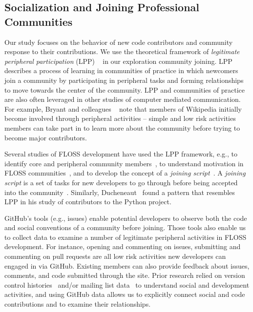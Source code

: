 \documentclass{sigchi}
\begin{document}
\subsection{Socialization and Joining Professional Communities} \label{sec:communities}
Our study focuses on the behavior of new code contributors and community
response to their contributions. We use the theoretical framework of
\textit{legitimate peripheral participation} (LPP) ~\cite{lave_situated_1991} in
our exploration community joining. LPP describes a process of learning in
communities of practice in which newcomers join a community by participating in
peripheral tasks and forming relationships to move towards the center of the
community. LPP and communities of practice are also often leveraged in other studies of
computer mediated communication. For example, Bryant
and colleagues ~\cite{bryant_becoming_2005} note that members of Wikipedia initially become involved
through peripheral activities -- simple and low risk activities members
can take part in to learn more about the community before trying to become major
contributors.

Several studies of FLOSS development have used the LPP framework, e.g., to 
 identify core and peripheral community members~\cite{huang_mining_2005}, to understand motivation in FLOSS communities~\cite{ye_toward_2003}, and to develop the concept of a \textit{joining
script}~\cite{von_krogh_community_2003}. A \textit{joining
script} is a set of tasks for new developers to go through
before being accepted into the community~\cite{von_krogh_community_2003}.
Similarly, Ducheneaut~\cite{ducheneaut_socialization_2005} found a pattern that resembles
LPP in his study of contributors to the Python project. 

GitHub's tools (e.g., issues) enable potential developers to observe both the code and social conventions of a community before joining. Those tools also enable us to collect data to examine a number of legitimate peripheral activities in FLOSS development. For instance, opening and commenting on  issues, submitting and commenting on pull requests are all low risk activities new developers can engaged in via GitHub. Existing members can also provide feedback about issues, comments, and code submitted through the site. Prior research relied on version control histories~\cite{huang_mining_2005} and/or mailing list data~\cite{ducheneaut_socialization_2005, von_krogh_community_2003} to understand social and development activities, and using GitHub data allows us to explicitly connect social and code contributions and to examine their relationships.
\end{document}
